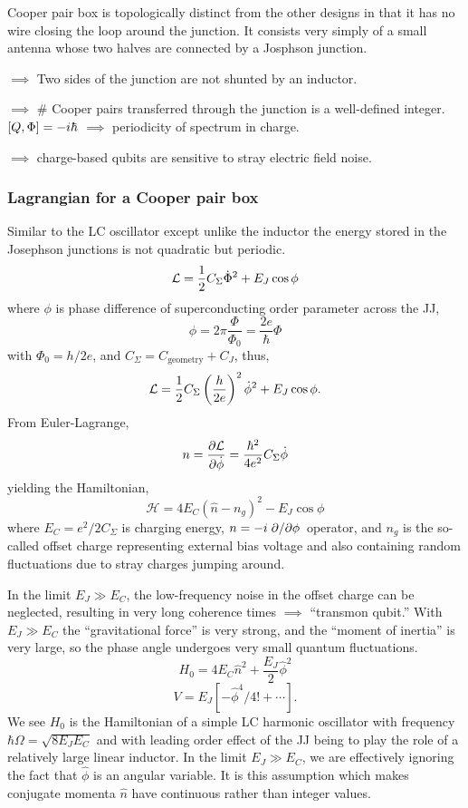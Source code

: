 \documentclass[12pt]{article}
\begin{document}
Cooper pair box is topologically distinct from the other designs in that it has
no wire closing the loop around the junction. It consists very simply of a
small antenna whose two halves are connected by a Josphson junction.

$\implies$ Two sides of the junction are not shunted by an inductor.

$\implies$ \# Cooper pairs transferred through the junction is a well-defined
integer. $\comm{Q}{\Phi} = -i\hbar$ $\implies$ periodicity of spectrum in
charge.

$\implies$ charge-based qubits are sensitive to stray electric field noise.

\subsubsection{Lagrangian for a Cooper pair box}
Similar to the LC oscillator except unlike the inductor the energy stored in
the Josephson junctions is not quadratic but periodic.
\[\mathcal{L} = \frac{1}{2} C_\Sigma \dot{\Phi}^2 + E_J \cos\phi\]
where $\phi$ is phase difference of superconducting order parameter across the
JJ,
\[\phi = 2\pi \frac{\Phi}{\Phi_0} = \frac{2e}{\hbar} \Phi\]
with $\Phi_0 = h/2e$, and $C_\Sigma = C_\text{geometry} + C_J$, thus,
\[\mathcal{L} = \frac{1}{2} C_\Sigma \left( \frac{h}{2e} \right)^2 \dot{\phi}^2 +
E_J\cos\phi.\]
From Euler-Lagrange,
\[n = \pdv{\mathcal{L}}{\dot{\phi}} = \frac{\hbar^2}{4e^2} C_\Sigma \dot{\phi}\]
yielding the Hamiltonian,
\[\mathcal{H} = 4E_C(\hat{n} - n_g)^2 - E_J\cos{\phi}\]
where $E_C = e^2/2C_\Sigma$ is charging energy, $n = -i\pdv*{\phi}$ operator,
and $n_g$ is the so-called offset charge representing external bias voltage and
also containing random fluctuations due to stray charges jumping around.

In the limit $E_J \gg E_C$, the low-frequency noise in the offset charge can be
neglected, resulting in very long coherence times $\implies$ ``transmon
qubit.'' With $E_J \gg E_C$ the ``gravitational force'' is very strong, and the
``moment of inertia'' is very large, so the phase angle undergoes very small
quantum fluctuations.
\[H_0 = 4E_C\hat{n}^2 + \frac{E_J}{2} \hat{\phi}^2\]
\[V = E_J\left[-\hat{\phi}^4 / 4! + \cdots\right].\]
We see $H_0$ is the Hamiltonian of a simple LC harmonic oscillator with
frequency $\hbar\Omega = \sqrt{8E_JE_C}$ and with leading order effect of the
JJ being to play the role of a relatively large linear inductor. In the limit
$E_J \gg E_C$, we are effectively ignoring the fact that $\hat{\phi}$ is an
angular variable. It is this assumption which makes conjugate momenta $\hat{n}$
have continuous rather than integer values.
\end{document}
